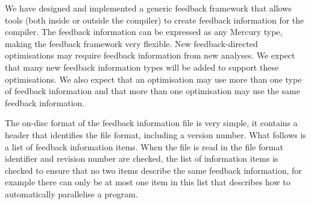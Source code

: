 

We have designed and implemented a generic feedback framework that allows
tools (both inside or outside the compiler)
to create feedback information for the compiler.
The feedback information can be expressed as any Mercury type, making the
feedback framework very flexible.
New feedback-directed optimisations may require feedback information
from new analyses.
We expect that many new feedback information types will be added to
support these optimisations.
We also expect that an optimisation may use more than one type of
feedback information and that more than one optimisation may use the
same feedback information.

The on-disc format of the feedback information file is very simple, it
contains a header that identifies the file format, including a version number.
What follows is a list of feedback information items.
When the file is read in the file format identifier and revision
number are checked,
the list of information items is checked to ensure that no two items
describe the same feedback information, for example there can only be at
most one item in this list that describes how to automatically
parallelise a program.

